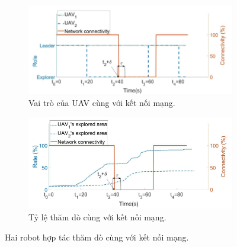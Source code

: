 \documentclass[11pt,openany]{book}
\begin{document}
\begin{figure}[H]
    \centering
    \begin{subfigure}[H]{0.8\linewidth}
        \includegraphics[width=\linewidth]{assets/4_11_a.png}
        \caption{{Vai trò của UAV cùng với kết nối mạng.}}
        \label{fig:4.11a}
    \end{subfigure}
    \begin{subfigure}[H]{0.8\linewidth}
        \includegraphics[width=\linewidth]{assets/4_11_b.png}
        \caption{{Tỷ lệ thăm dò cùng với kết nối mạng.}}
        \label{fig:4.11b}
    \end{subfigure}
    \caption{{Hai robot hợp tác thăm dò cùng với kết nối mạng.}}
    \label{fig:4.11}
\end{figure}
\end{document}
